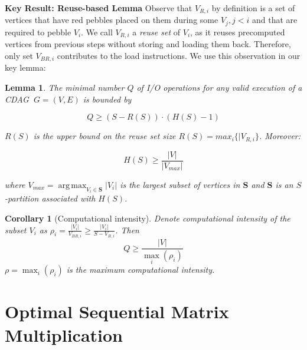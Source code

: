 \documentclass[sigplan,review,anonymous]{acmart}\settopmatter{printfolios=true,printccs=false,printacmref=false}
\newtheorem*{corollary*}{Corollary}
\DeclareMathOperator*{\argmax}{arg\,max}
\newtheorem{lma}{Lemma}
\newcommand{\macb}[1]{\textbf{\textsf{#1}}}
\begin{document}
\macb{Key Result: Reuse-based Lemma}
Observe that $V_{R,i}$ by definition is a set of vertices that have red pebbles 
placed on them during some $V_j, j < i$ and that are required to pebble $V_i$. 
We call $V_{R,i}$ a \emph{reuse set} of $V_i$, as it reuses 
precomputed vertices from previous steps without storing and loading them 
back. Therefore, only set $V_{BR,i}$ contributes to the load instructions. We 
use this observation in our key lemma:

\begin{lma}
	\label{lma:reuse}
	The minimal number $Q$ of I/O operations for any valid execution of a CDAG 
	$\ G=(V,E)$ is bounded by  
	
	\vspace{-0.5em}
	\begin{equation}
	Q \ge (S - R(S)) \cdot (H(S) - 1)
	\label{eq:reusebound} \end{equation}
	\vspace{-0.5em}
	
	\noindent
	$R(S)$ is the upper bound on the reuse set size $R(S) = max_i\{|V_{R,i}\}$. 
Moreover: 
	
	\vspace{-0.5em}
	\begin{equation}\label{eq:reusebound-pmax}
	H(S) \ge \frac{|V|}{|V_{max}|}
	\end{equation}
	\vspace{-0.5em}
	
	\noindent
	where $V_{max} = \argmax_{V_i \in \mathcal{\mathbf{S}}}|V_i|$ is the largest
	subset of vertices in $\mathcal{\mathbf{S}}$ and $\mathcal{\mathbf{S}}$ is 
	an
	$S$-partition associated with $H(S)$.

\end{lma}

\begin{corollary*}[Computational intensity]
	\label{cor:q}
	Denote computational intensity of the subset $V_i$ as $\rho_i =  
	\frac{|V_i|}{V_{BR,i}} \ge \frac{|V_i|}{S - V_{R,i}}$. Then
	\begin{equation}
	Q \ge \frac{|V|}{\max_i(\rho_i)}
	\end{equation} 
	$\rho = \max_i(\rho_i)$ is the \emph{maximum} computational intensity.
\end{corollary*}


\section{\hspace{-0.5em}Optimal Sequential Matrix Multiplication}
\label{sec:seqOptimality}
\end{document}
